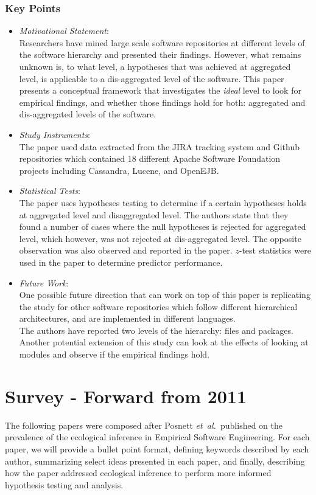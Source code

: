 \documentclass{sig-alternate-05-2015}
\newcommand{\etal}{\mbox{\emph{et al.\ }}}
\begin{document}
\subsubsection{Key Points}

\begin{itemize}
\item \emph{Motivational Statement}: \\
Researchers have mined large scale software repositories at different levels 
of the software hierarchy and presented their findings. However, what remains 
unknown is, to what level, a hypotheses that was achieved at aggregated level, is 
applicable to a dis-aggregated level of the software. This paper presents a conceptual 
framework that investigates the \textit{ideal} level 
to look for empirical findings, and whether those findings hold for both: aggregated 
and dis-aggregated levels of the software.    
\item \emph{Study Instruments}: \\
The paper used data extracted from the JIRA tracking system and Github repositories 
which contained 18 different Apache Software Foundation projects including Cassandra,  
Lucene, and OpenEJB. 

\item \emph{Statistical Tests}: \\
The paper uses hypotheses testing to determine if a certain hypotheses 
holds at aggregated level and disaggregated level. The authors state that  
they found a number of cases where the null hypotheses is rejected 
for aggregated level, which however, was not rejected at dis-aggregated level. 
The opposite observation was also observed and reported in the paper.  $z$-test 
statistics were used in the paper to determine predictor performance.

\item \emph{Future Work}: \\
One possible future direction that can work on top of  this 
paper is replicating the study for other software repositories 
which follow different hierarchical architectures, and are implemented 
in different languages. \\ 
The authors have reported two levels of the hierarchy: files and packages. 
Another potential extension of this study can look at the effects of looking 
at modules and observe if the empirical findings hold. \\
\end{itemize} 

\section{Survey - Forward from 2011}
The following papers were composed after Posnett \etal \newline published on the prevalence of the ecological inference in Empirical Software Engineering.  For each paper, we will provide a bullet point format, defining keywords described by each author, summarizing select ideas presented in each paper, and finally, describing how the paper addressed ecological inference to perform more informed hypothesis testing and analysis.
\end{document}
